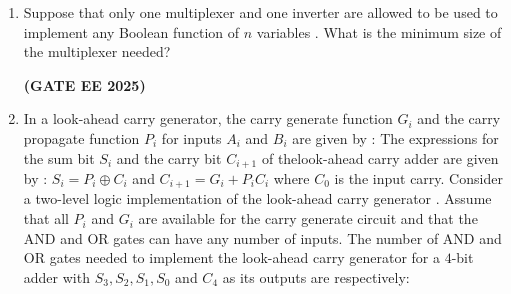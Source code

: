 \documentclass[journal,12pt,onecolumn]{IEEEtran}
\theoremstyle{remark}
\begin{document}
\begin {center}
\begin{enumerate}
\begin{enumerate}
        
    \end{enumerate}
    \hfill \textbf{(GATE EE 2025)}
    \item Suppose that only one multiplexer and one inverter are allowed to be used to implement any Boolean function of $n$ variables . What is the minimum size of the multiplexer needed?
    \begin{enumerate}
    \end{enumerate}
    \hfill \textbf{(GATE EE 2025)}
     
    \item In a look-ahead carry generator, the carry generate function $ G_i$ and the carry propagate function $P_i$ for inputs $A_i$ and $B_i$ are given by :
    \newline 
    The expressions for the sum bit $S_i$ and the carry bit $C_{i+1}$ of thelook-ahead carry adder are given by :
    \newline 
    $S_i=P_i \oplus C_i$ and $C_{i+1}= G_i +P_i C_i$ where $C_0$ is the input carry.
    \newline 
    Consider a two-level logic implementation  of the look-ahead carry generator . Assume that all $P_i$ and $G_i$ are available for the carry generate circuit and that the AND and OR gates can have any number of inputs. The number of AND and OR gates  needed to implement the look-ahead carry generator  for a $4$-bit adder with $S_3,S_2,S_1,S_0$ and $C_4$ as its outputs are respectively:
    \begin{enumerate}
\end{enumerate}
\end{enumerate}
\end{center}
\end{document}
